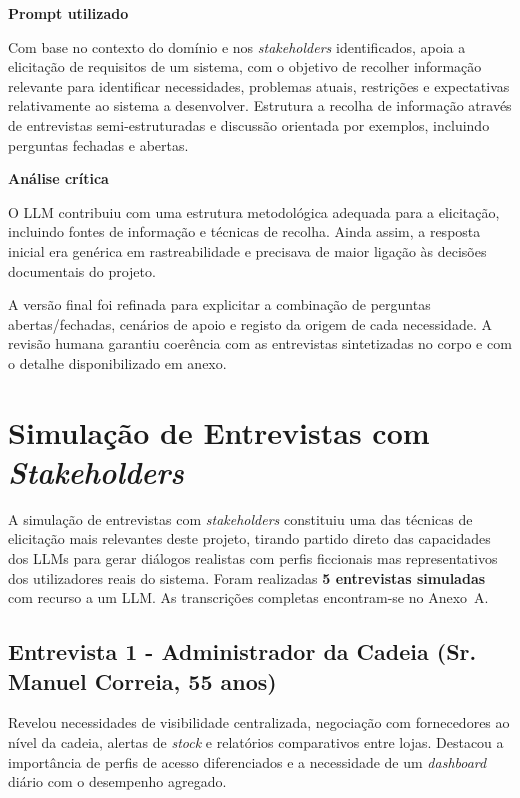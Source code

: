     \begin{tcolorbox}[title=Interação com o LLM]
    \textbf{Prompt utilizado}

    Com base no contexto do domínio e nos \textit{stakeholders} identificados, apoia a elicitação de requisitos de um sistema, com o objetivo de recolher informação relevante para identificar necessidades, problemas atuais, restrições e expectativas relativamente ao sistema a desenvolver. Estrutura a recolha de informação através de entrevistas semi-estruturadas e discussão orientada por exemplos, incluindo perguntas fechadas e abertas.

    \tcblower

    \textbf{Análise crítica}

    O LLM contribuiu com uma estrutura metodológica adequada para a elicitação, incluindo fontes de informação e técnicas de recolha. Ainda assim, a resposta inicial era genérica em rastreabilidade e precisava de maior ligação às decisões documentais do projeto.

    A versão final foi refinada para explicitar a combinação de perguntas abertas/fechadas, cenários de apoio e registo da origem de cada necessidade. A revisão humana garantiu coerência com as entrevistas sintetizadas no corpo e com o detalhe disponibilizado em anexo.
    \end{tcolorbox}

\section{Simulação de Entrevistas com \textit{Stakeholders}}
\label{sec:entrevistas}

    A simulação de entrevistas com \textit{stakeholders} constituiu uma das técnicas de elicitação mais relevantes deste projeto, tirando partido direto das capacidades dos LLMs para gerar diálogos realistas com perfis ficcionais mas representativos dos utilizadores reais do sistema. Foram realizadas \textbf{5 entrevistas simuladas} com recurso a um LLM. As transcrições completas encontram-se no Anexo~A.

    \subsection{Entrevista 1 - Administrador da Cadeia (Sr. Manuel Correia, 55 anos)}
    Revelou necessidades de visibilidade centralizada, negociação com fornecedores ao nível da cadeia, alertas de \textit{stock} e relatórios comparativos entre lojas. Destacou a importância de perfis de acesso diferenciados e a necessidade de um \textit{dashboard} diário com o desempenho agregado.

